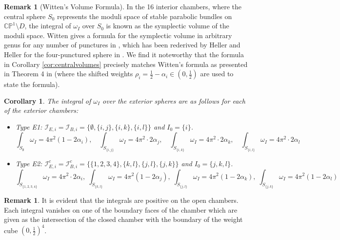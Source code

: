 \documentclass[12pt,letterpaper,reqno]{amsart}
\newtheorem{cor}[thm]{Corollary}
\theoremstyle{remark}
\theoremstyle{definition}
\newtheorem{rem}[thm]{Remark}
\numberwithin{thm}{section}
\numberwithin{equation}{section}
\numberwithin{figure}{section}
\newcommand{\CP}{\ensuremath{\mathbb {CP}}}
\begin{document}
 \begin{rem}[Witten's Volume Formula]
 In the 16 interior chambers, where the central sphere $S_0$ represents the moduli space of stable parabolic bundles on $\CP^1 \setminus D$, the integral of $\omega_I$ over $S_0$ is known as the symplectic volume of the moduli space. Witten gives a formula for the symplectic volume in arbitrary genus for any number of punctures  in \cite{Witten91}, which has been rederived by Heller and Heller for the four-punctured sphere in \cite{hellerheller}. We find it noteworthy that the formula in Corollary \ref{cor:centralvolumes} precisely matches Witten's formula as presented in Theorem 4 in \cite{hellerheller} (where the shifted weights $\rho_i = \frac 12 - \alpha_i \in (0, \frac 12)$ are used  to state the formula).
  \end{rem}
   
\begin{cor}
    The integral of $\omega_I$ over the exterior spheres are as follows for each of the exterior chambers:
    \smallskip
   \begin{itemize}
       \item Type E1: $\mathcal{I}_{E, i}=\mathcal{I}_{B, i}=\{\emptyset, \{i,j\}, \{i,k\}, \{i,l\}\}$ and $I_0=\{i\}$.
    \[ \int_{S_\emptyset} \omega_I = 4 \pi^2(1-2\alpha_i), \quad \int_{S_{\{i,j\}}} \omega_I= 4 \pi^2 \cdot 2 \alpha_j,  \quad \int_{S_{\{i,k\}}} \omega_I = 4 \pi^2 \cdot 2 \alpha_k,  \quad \int_{S_{\{i,l\}}} \omega_I= 4 \pi^2 \cdot 2 \alpha_l  \]
    \item Type E2: $\mathcal{I}_{E, i}^c=\mathcal{I}_{B, i}^c=\{ \{1, 2, 3, 4\}, \{k,l\}, \{j,l\}, \{j,k\}\}$ and $I_0=\{j, k, l\}$.
    \[ \int_{S_{\{1, 2, 3, 4\}}} \omega_I = 4 \pi^2 \cdot 2\alpha_i, \; \int_{S_{\{k,l\}}} \omega_I= 4 \pi^2(1-2 \alpha_j),  \; \int_{S_{\{j,l\}}} \omega_I = 4 \pi^2(1-2 \alpha_k),  \; \int_{S_{\{j,k\}}} \omega_I= 4 \pi^2(1-2 \alpha_l) \]
    \end{itemize}
\end{cor}

\begin{rem}
It is evident that the integrals are positive on the open chambers. Each integral vanishes on one of the boundary faces of the chamber which are given as the intersection of the closed chamber with the boundary of the weight cube $(0,\frac 12)^4$. 
\end{rem}
\end{document}
